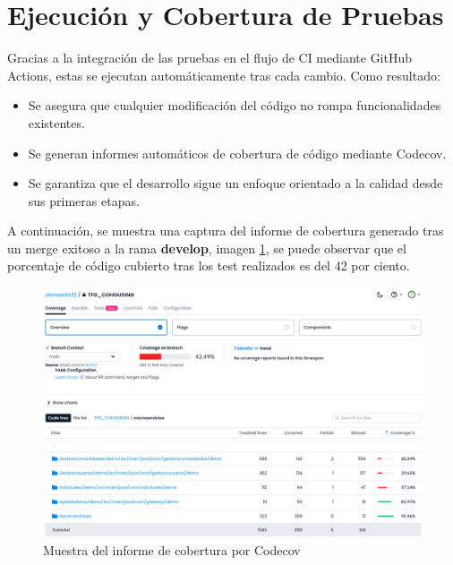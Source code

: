 \section{Ejecución y Cobertura de Pruebas}
Gracias a la integración de las pruebas en el flujo de CI mediante GitHub Actions, estas se ejecutan automáticamente tras cada cambio. Como resultado:

\begin{itemize}
    \item Se asegura que cualquier modificación del código no rompa funcionalidades existentes.
    \item Se generan informes automáticos de cobertura de código mediante Codecov.
    \item Se garantiza que el desarrollo sigue un enfoque orientado a la calidad desde sus primeras etapas.
\end{itemize}

A continuación, se muestra una captura del informe de cobertura generado tras un merge exitoso a la rama \textbf{develop}, imagen \ref{fig:codecov}, se puede observar que el porcentaje de código cubierto tras los test realizados es del 42 por ciento. 

\begin{figure}[h!]
  \centering
  \includegraphics[width=1\textwidth]{fotos/codecov-coverage.png}
  \caption{Muestra del informe de cobertura por Codecov}
  \label{fig:codecov}
\end{figure}
